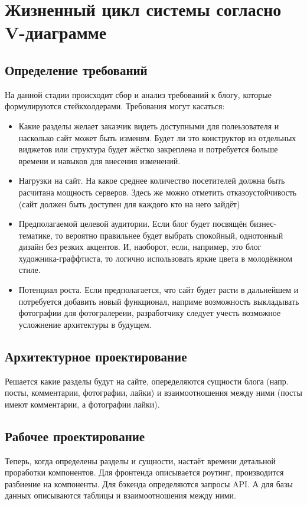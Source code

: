 \documentclass[bibliography=totocnumbered]{scrartcl}
\begin{document}
\section{Жизненный цикл системы согласно V-диаграмме}

\subsection{Определение требований}
На данной стадии происходит сбор и анализ требований к блогу, которые формулируются стейкхолдерами. Требования могут касаться:
\begin{itemize}
    \item Какие разделы желает заказчик видеть доступными для полеьзователя и насколько сайт может быть изменям. Будет ли это конструктор из отдельных виджетов или структура будет жёстко закреплена и потребуется больше времени и навыков для внесения изменений.

    \item Нагрузки на сайт. На какое среднее количество посетителей должна быть расчитана мощность серверов. Здесь же можно отметить отказоустойчивость (сайт должен быть доступен для каждого кто на него зайдёт)

    \item Предполагаемой целевой аудитории. Если блог будет посвящён бизнес-тематике, то вероятно правильнее будет выбрать спокойный, однотонный дизайн без резких акцентов. И, наоборот, если, например, это блог художника-граффтиста, то логично использовать яркие цвета в молодёжном стиле.

    \item Потенциал роста. Если предполагается, что сайт будет расти в дальнейшем и потребуется добавить новый функционал, наприме возможность выкладывать фотографии для фотогралереии, разработчику следует учесть возможное усложнение архитектуры в будущем.
\end{itemize}

\subsection{Архитектурное проектирование}
Решается какие разделы будут на сайте, опеределяются сущности блога (напр. посты, комментарии, фотографии, лайки) и взаимоотношения между ними (посты имеют комментарии, а фотографии лайки).

\subsection{Рабочее проектирование}
Теперь, когда определены разделы и сущности, настаёт времени детальной проработки компонентов. Для фронтенда описывается роутинг, производится разбиение на компоненты. Для бэкенда определяются запросы API. А для базы данных описываются таблицы и взаимоотношения между ними.
\end{document}
